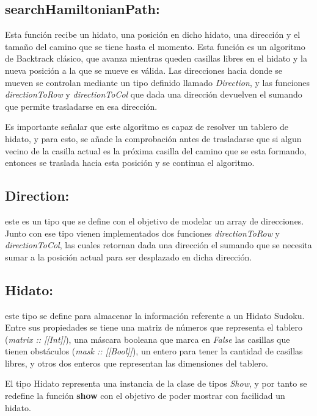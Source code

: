 \documentclass[10pt]{amsart}
\begin{document}
    \subsection*{searchHamiltonianPath:} Esta funci\'on recibe un hidato, una posici\'on en dicho hidato, una direcci\'on y el tama\~no del camino que se tiene hasta el momento. Esta funci\'on es un algoritmo de Backtrack cl\'asico, que avanza mientras queden casillas libres en el hidato y la nueva posici\'on a la que se mueve es v\'alida. Las direcciones hacia donde se mueven se controlan mediante un tipo definido llamado \textit{Direction}, y las funciones \textit{directionToRow} y \textit{directionToCol} que dada una direcci\'on devuelven el sumando que permite trasladarse en esa direcci\'on. 

    Es importante se\~nalar que este algoritmo es capaz de resolver un tablero de hidato, y para esto, se a\~nade la comprobaci\'on antes de trasladarse que si algun vecino de la casilla actual es la pr\'oxima casilla del camino que se esta formando, entonces se traslada hacia esta posici\'on y se continua el algoritmo.
                 
    \subsection*{Direction:} este es un tipo que se define con el objetivo de modelar un array de direcciones. Junto con ese tipo vienen implementados dos funciones \textit{directionToRow} y \textit{directionToCol}, las cuales retornan dada una direcci\'on el sumando que se necesita sumar a la posici\'on actual para ser desplazado en dicha direcci\'on.

    \subsection*{Hidato:} este tipo se define para almacenar la informaci\'on referente a un Hidato Sudoku. Entre sus propiedades se tiene una matriz de n\'umeros que representa el tablero (\textit{matrix :: [[Int]]}), una m\'ascara booleana que marca en \textit{False} las casillas que tienen obst\'aculos (\textit{mask :: [[Bool]]}), un entero para tener la cantidad de casillas libres, y otros dos enteros que representan las dimensiones del tablero. 

    El tipo Hidato representa una instancia de la clase de tipos \textit{Show}, y por tanto se redefine la funci\'on \textbf{show} con el objetivo de poder mostrar con facilidad un hidato.
		
\end{document}
